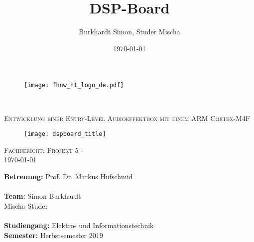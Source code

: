 \documentclass[final]{fhnwreport}       %
\title{\textbf{DSP-Board}}  		        %
\author{Burkhardt Simon, Studer Mischa} %
\date{\today}          				   %
\begin{document}
\thispagestyle{empty}
	\begin{figure}
		 \vspace*{-\topskip}\vspace*{-\headsep}
		\texttt{[image: fhnw\_ht\_logo\_de.pdf]}
	\end{figure}
	\begin{center}
		\vspace*{1.5cm}
		{\huge{\textbf{\thetitle}}}\\
		\vspace*{0.5cm}
		
		{\scshape\Large Entwicklung einer Entry-Level Audioeffektbox mit einem ARM Cortex-M4F \\} 
		\vfill
		\begin{figure}[H]
			\centering
			\texttt{[image: dspboard\_title]}
		\end{figure}
		{\scshape\Large Fachbericht: Projekt 5 - \theauthor \\} \Large{\today}
		\\[0.8cm]
		\begin{normalsize}
			{\begin{tabbing}
					\textbf{Betreuung:} \hspace{5cm}\= Prof. Dr. Markus Hufschmid\\
					
					
					\\[0.2cm]
					\textbf{Team:} \> Simon Burkhardt\\ 
					\> Mischa Studer\\
					\\[0.2cm]
					\textbf{Studiengang:} \>Elektro- und Informationstechnik
					\\[0.8cm]	\textbf{Semester:} \>Herbstsemester 2019
			\end{tabbing}}
		\end{normalsize}
		\vfill
	\end{center}
\clearpage

\thispagestyle{empty}
\begin{otherlanguage}{english}

\end{otherlanguage}
\end{document}
